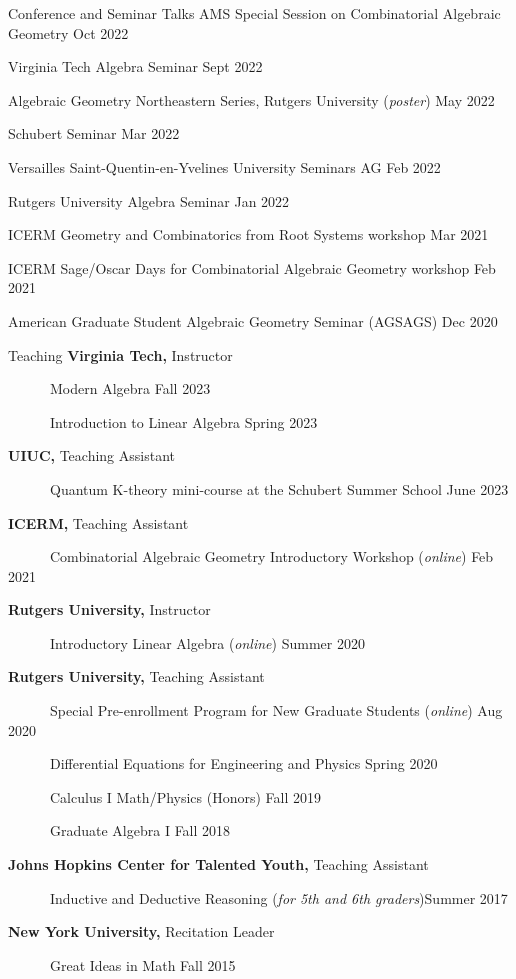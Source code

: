 \documentclass{resume} %
\begin{document}
\begin{rSection}{Conference and Seminar Talks}
    AMS Special Session on Combinatorial Algebraic Geometry \hfill{Oct 2022}

    Virginia Tech Algebra Seminar \hfill{Sept 2022}

    Algebraic Geometry Northeastern Series, Rutgers University (\emph{poster}) \hfill{May 2022}

Schubert Seminar  \hfill{Mar 2022}

Versailles Saint-Quentin-en-Yvelines University Seminars AG \hfill{Feb 2022}

Rutgers University Algebra Seminar \hfill{Jan 2022}

ICERM Geometry and Combinatorics from Root Systems workshop \hfill{Mar 2021}

ICERM Sage/Oscar Days for Combinatorial Algebraic Geometry workshop \hfill{Feb 2021}

American Graduate Student Algebraic Geometry Seminar (AGSAGS) \hfill{Dec 2020}
\end{rSection} 

\begin{rSection}{Teaching} 
    {\bf Virginia Tech,} Instructor

    \mbox{\ \ \ \ \ \ }Modern Algebra \hfill{Fall 2023}

    \mbox{\ \ \ \ \ \ }Introduction to Linear Algebra \hfill{Spring 2023}

    {\bf UIUC,} Teaching Assistant 

    \mbox{\ \ \ \ \ \ }Quantum K-theory mini-course at the Schubert Summer School \hfill{June 2023}

    {\bf ICERM,} Teaching Assistant

    \mbox{\ \ \ \ \ \ }Combinatorial Algebraic Geometry Introductory Workshop (\emph{online}) \hfill{Feb 2021}
    
    {\bf Rutgers University,} Instructor

    \mbox{\ \ \ \ \ \ }Introductory Linear Algebra (\emph{online}) \hfill{Summer 2020}

    {\bf Rutgers University,} Teaching Assistant

    \mbox{\ \ \ \ \ \ }Special Pre-enrollment Program for New Graduate Students (\emph{online}) \hfill{Aug 2020}

    \mbox{\ \ \ \ \ \ }Differential Equations for Engineering and Physics \hfill{Spring 2020}

    \mbox{\ \ \ \ \ \ }Calculus I Math/Physics (Honors) \hfill{Fall 2019}

    \mbox{\ \ \ \ \ \ }Graduate Algebra I \hfill{Fall 2018}

    {\bf Johns Hopkins Center for Talented Youth,} Teaching Assistant

    \mbox{\ \ \ \ \ \ }Inductive and Deductive Reasoning (\emph{for 5th and 6th graders})\hfill{Summer 2017}

    {\bf New York University,} Recitation Leader

    \mbox{\ \ \ \ \ \ }Great Ideas in Math \hfill{Fall 2015}
\end{rSection}
\end{document}
